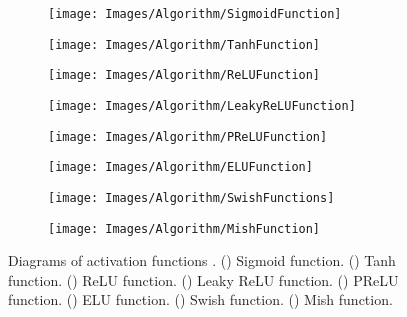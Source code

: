 \begin{figure}[h!]
	\centering
	
	\begin{subfigure}{0.22\textwidth}
		\texttt{[image: Images/Algorithm/SigmoidFunction]}
		\caption{}    %
		\label{subfig:Sigmoid}
	\end{subfigure}
	\hfill
	\begin{subfigure}{0.22\textwidth}
		\texttt{[image: Images/Algorithm/TanhFunction]}
		\caption{}    %
		\label{subfig:Tanh}
	\end{subfigure}
	\hfill
	\begin{subfigure}{0.22\textwidth}
		\texttt{[image: Images/Algorithm/ReLUFunction]}
		\caption{}    %
		\label{subfig:ReLU}
	\end{subfigure}
	\hfill
	\begin{subfigure}{0.22\textwidth}
		\texttt{[image: Images/Algorithm/LeakyReLUFunction]}
		\caption{}    %
		\label{subfig:LeakyReLU}
	\end{subfigure}
	
	\medskip
	
	\begin{subfigure}{0.22\textwidth}
		\texttt{[image: Images/Algorithm/PReLUFunction]}
		\caption{}    %
		\label{subfig:PReLU}
	\end{subfigure}
	\hfill
	\begin{subfigure}{0.22\textwidth}
		\texttt{[image: Images/Algorithm/ELUFunction]}
		\caption{}    %
		\label{subfig:ELU}
	\end{subfigure}
	\hfill
	\begin{subfigure}{0.22\textwidth}
		\texttt{[image: Images/Algorithm/SwishFunctions]}
		\caption{}    %
		\label{subfig:Swish}
	\end{subfigure}
	\hfill
	\begin{subfigure}{0.22\textwidth}
		\texttt{[image: Images/Algorithm/MishFunction]}
		\caption{}    %
		\label{subfig:Mish}
	\end{subfigure}
	
	\caption{Diagrams of activation functions \cite{Li:2021}.  () Sigmoid function.  () Tanh function. () ReLU function. () Leaky ReLU function. () PReLU function. () ELU function.  () Swish function. () Mish function.}
	\label{fig:activationFunctions}
\end{figure}

